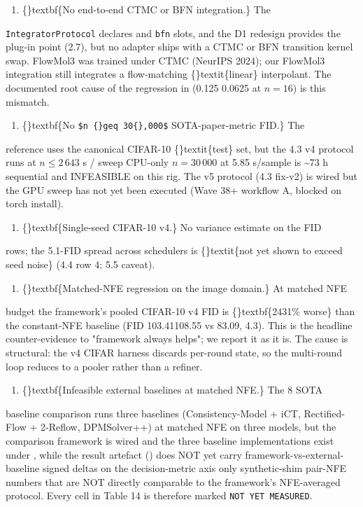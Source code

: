 \documentclass{article}
\begin{document}
\begin{enumerate}
\item \{\}textbf\{No end-to-end CTMC or BFN integration.\} The
\end{enumerate}
\texttt{IntegratorProtocol} declares  and \texttt{bfn} slots, and the D1 redesign provides the plug-in point (2.7), but no adapter ships with a CTMC or BFN transition kernel swap. FlowMol3 was trained under CTMC (NeurIPS 2024); our FlowMol3 integration still integrates a flow-matching \{\}textit\{linear\} interpolant. The documented root cause of the regression in  (0.125  0.0625 at $n=16$) is this mismatch.

\begin{enumerate}
\item \{\}textbf\{No \texttt{\$n \{\}geq 30\{\},000\$} SOTA-paper-metric FID.\} The
\end{enumerate}
 reference uses the canonical CIFAR-10 \{\}textit\{test\} set, but the 4.3 v4 protocol runs at $n \leq 2\,643$ s / sweep CPU-only  $n=30\,000$ at 5.85 s/sample is \textasciitilde{}73 h sequential and INFEASIBLE on this rig. The v5 protocol (4.3 fix-v2) is wired but the GPU sweep has not yet been executed (Wave 38+ workflow A, blocked on torch install).

\begin{enumerate}
\item \{\}textbf\{Single-seed CIFAR-10 v4.\} No variance estimate on the FID
\end{enumerate}
rows; the 5.1-FID spread across schedulers is \{\}textit\{not yet shown to exceed seed noise\} (4.4 row 4; 5.5 caveat).

\begin{enumerate}
\item \{\}textbf\{Matched-NFE regression on the image domain.\} At matched NFE
\end{enumerate}
budget the framework's pooled CIFAR-10 v4 FID is \{\}textbf\{2431\% worse\} than the constant-NFE baseline (FID 103.41108.55 vs 83.09, 4.3). This is the headline counter-evidence to "framework always helps"; we report it as it is. The cause is structural: the v4 CIFAR harness discards per-round state, so the multi-round loop reduces to a pooler rather than a refiner.

\begin{enumerate}
\item \{\}textbf\{Infeasible external baselines at matched NFE.\} The 8 SOTA
\end{enumerate}
baseline comparison runs three baselines (Consistency-Model + iCT, Rectified-Flow + 2-Reflow, DPMSolver++) at matched NFE on three models, but the comparison framework is wired and the three baseline implementations exist under , while the result artefact () does NOT yet carry framework-vs-external-baseline signed deltas on the decision-metric axis  only synthetic-shim pair-NFE numbers that are NOT directly comparable to the framework's NFE-averaged protocol. Every cell in Table 14 is therefore marked \texttt{NOT YET MEASURED}.
\end{document}
